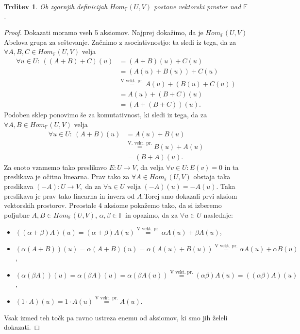 \documentclass[10pt, a4paper]{article}
\newtheorem{trditev}[izr]{Trditev}
\newenvironment{noticeC}{%
  \tcolorbox[%
  notitle,
  empty,
  enhanced,  %
  breakable,
  coltext=black, 
  fontupper=\rmfamily,
  parbox=false,
  noparskip,
  sharp corners,
  boxrule=-1pt,  %
  frame hidden,
  left=7pt,  %
  right=7pt,
  top=5pt,
  bottom=5pt,
  before skip=2.5ex plus 2pt,
  after skip=2.5ex plus 2pt,
  overlay unbroken and last={%
  },
  ]}
{\endtcolorbox}
\newenvironment{dokaz}%
  {\begin{noticeC}\begin{proof}}%
  {\end{proof}\end{noticeC}}
\newcommand{\F}{\mathbb {F}}
\begin{document}
\begin{trditev}
    Ob zgornjih definicijah $Hom_\F (U,V)$ postane vektorski prostor nad $\F$.
\end{trditev}

\begin{dokaz}
    Dokazati moramo vseh 5 aksiomov. Najprej dokažimo, da je
    $Hom_\F (U,V)$ Abelova grupa za seštevanje.
            Začnimo z asociativnostjo: ta sledi iz tega, da za $\forall A,B,C \in Hom_\F (U,V)$ velja
            \begin{align*}
                \forall u \in U:\ ((A+B)+C)(u) &= (A+B)(u) + C(u)\\
                &= (A(u) + B(u)) + C(u)\\
                &\stackrel{\text{V vekt. pr.}}{=} A(u) + (B(u) + C(u))\\
                &= A(u) + (B+C)(u)\\
                &= (A + (B+C))(u).
            \end{align*}
            Podoben sklep ponovimo še za komutativnost, ki sledi iz tega, da za $\forall A,B \in Hom_\F (U,V)$ velja
            \begin{align*}
                \forall u \in U:\ (A+B)(u) &= A(u) + B(u)\\
                &\stackrel{\text{V. vekt. pr.}}{=} B(u) + A(u)\\
                &= (B + A)(u).
            \end{align*}
            Za enoto vzamemo tako preslikavo $E: U \rightarrow V$, da velja $\forall v \in U: E(v) = 0$ in ta preslikava je očitno linearna.
            Prav tako za $\forall A \in Hom_\F (U,V)$ obstaja taka preslikava $(-A): U \rightarrow V,$ da za $\forall u \in U$ velja $(-A)(u) = - A(u)$.
            Taka preslikava je prav tako linearna in inverz od $A$.Torej smo dokazali prvi aksiom vektorskih prostorov.
            Preostale 4 aksiome pokažemo tako, da si izberemo poljubne $A,B \in Hom_\F (U,V)$, $\alpha,\beta \in \F$ in opazimo, da za $\forall u \in U$ naslednje:
            \begin{itemize}
                \item $((\alpha + \beta)A)(u) = (\alpha + \beta) A(u)
            \stackrel{\text{V vekt. pr.}}{=} \alpha A(u) + \beta A(u)$,
                \item $(\alpha (A+B))(u) = \alpha (A + B)(u)
            = \alpha (A(u) + B(u))
            \stackrel{\text{V vekt. pr.}}{=} \alpha A(u) + \alpha B(u)$,
                \item $(\alpha (\beta A))(u) = \alpha (\beta A)(u)
            = \alpha (\beta A(u))
            \stackrel{\text{V vekt. pr.}}{=} (\alpha \beta) A(u)
            = ((\alpha \beta) A)(u)$,
                \item $(1 \cdot A)(u) = 1 \cdot A(u)
            \stackrel{\text{V vekt. pr.}}{=} A(u)$.
            \end{itemize}
            Vsak izmed teh točk pa ravno ustreza enemu od aksiomov, ki smo jih želeli dokazati.
\end{dokaz}
\end{document}
